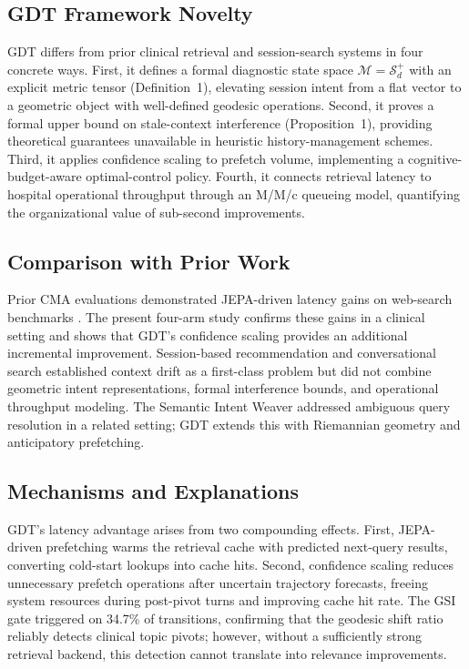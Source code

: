 \documentclass[11pt]{article}
\begin{document}
\subsection{GDT Framework Novelty}
GDT differs from prior clinical retrieval and session-search systems in four concrete ways. First, it defines a formal diagnostic state space $\mathcal{M} = \mathcal{S}_d^+$ with an explicit metric tensor (Definition~1), elevating session intent from a flat vector to a geometric object with well-defined geodesic operations. Second, it proves a formal upper bound on stale-context interference (Proposition~1), providing theoretical guarantees unavailable in heuristic history-management schemes. Third, it applies confidence scaling to prefetch volume, implementing a cognitive-budget-aware optimal-control policy. Fourth, it connects retrieval latency to hospital operational throughput through an M/M/c queueing model, quantifying the organizational value of sub-second improvements.

\subsection{Comparison with Prior Work}
Prior CMA evaluations demonstrated JEPA-driven latency gains on web-search benchmarks \citep{cma2026}. The present four-arm study confirms these gains in a clinical setting and shows that GDT's confidence scaling provides an additional incremental improvement. Session-based recommendation \citep{hidasi2015,wu2019_session} and conversational search \citep{iyyer20} established context drift as a first-class problem but did not combine geometric intent representations, formal interference bounds, and operational throughput modeling. The Semantic Intent Weaver \citep{papachappa2026_siweaver} addressed ambiguous query resolution in a related setting; GDT extends this with Riemannian geometry and anticipatory prefetching.

\subsection{Mechanisms and Explanations}
GDT's latency advantage arises from two compounding effects. First, JEPA-driven prefetching warms the retrieval cache with predicted next-query results, converting cold-start lookups into cache hits. Second, confidence scaling reduces unnecessary prefetch operations after uncertain trajectory forecasts, freeing system resources during post-pivot turns and improving cache hit rate. The GSI gate triggered on 34.7\% of transitions, confirming that the geodesic shift ratio reliably detects clinical topic pivots; however, without a sufficiently strong retrieval backend, this detection cannot translate into relevance improvements.
\end{document}
